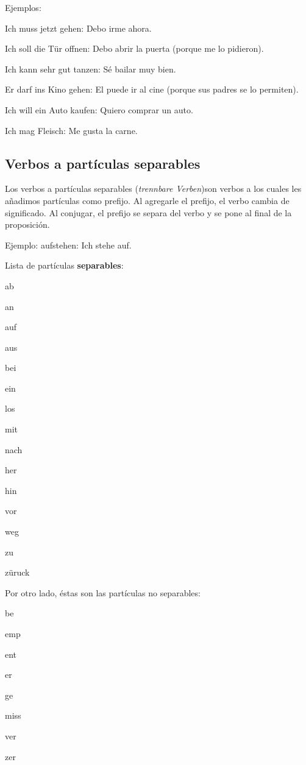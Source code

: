 Ejemplos: 
\begin{myitemize}
\item Ich muss jetzt gehen: Debo irme ahora.
\item Ich soll die Tür offnen: Debo abrir la puerta (porque me lo pidieron).
\item Ich kann sehr gut tanzen: Sé bailar muy bien.
\item Er darf ins Kino gehen: El puede ir al cine (porque sus padres se lo permiten).
\item Ich will ein Auto kaufen: Quiero comprar un auto.
\item Ich mag Fleisch: Me gusta la carne.
\end{myitemize}

\subsection{Verbos a partículas separables}
Los verbos a partículas separables (\textit{trennbare Verben})son verbos a los cuales les añadimos partículas como prefijo. Al agregarle el prefijo, el verbo cambia de significado. Al conjugar, el prefijo se separa del verbo y se pone al final de la proposición.

Ejemplo: aufstehen: Ich stehe auf.

Lista de partículas \textbf{separables}:
\begin{multicols}{4}
\begin{myitemize}
\item ab
\item an
\item auf
\item aus
\item bei
\item ein
\item los
\item mit
\item nach
\item her
\item hin
\item vor 
\item weg
\item zu
\item züruck
\end{myitemize}
\end{multicols}

Por otro lado, éstas son las partículas no separables:
\begin{multicols}{4}
\begin{myitemize}
\item be
\item emp
\item ent
\item er
\item ge
\item miss
\item ver
\item zer
\end{myitemize}
\end{multicols}

